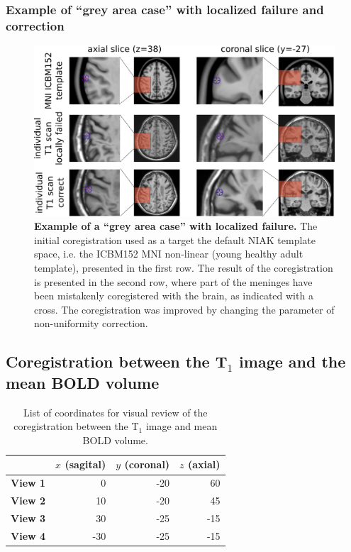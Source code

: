 \documentclass[12pt]{paper}%
\begin{document}
\subsubsection{Example of ``grey area case'' with localized failure and correction}
\begin{figure}[htbp]
\begin{center}
\includegraphics[width=0.7\linewidth]{fig_qc_grey_case}

\end{center}
\caption{
{\bf Example of a ``grey area case'' with localized failure.} {The initial coregistration used as a target the default NIAK template space, i.e. the ICBM152 MNI non-linear (young healthy adult template), presented in the first row. The result of the coregistration is presented in the second row, where part of the meninges have been mistakenly coregistered with the brain, as indicated with a cross. The coregistration was improved by changing the parameter of non-uniformity correction.}
}
\label{fig_qc_grey_case}
\end{figure}

\subsection{Coregistration between the T$_1$ image and the mean BOLD volume}

\begin{table}[htbp]
\centering
\captionsetup{justification=centering,margin=2cm}
\label{tab_coord_bold}
 \begin{tabular}{c|rrr}
  & $x$ (sagital) & $y$ (coronal) & $z$ (axial)\\
  \hline
  \textbf{View 1} & 0 & -20 & 60\\
  \textbf{View 2} & 10 & -20 & 45\\
  \textbf{View 3} & 30 & -25 & -15\\
  \textbf{View 4} & -30 & -25 & -15\\
 \end{tabular} 
 \caption{List of coordinates for visual review of the coregistration between the T$_1$ image and mean BOLD volume.}
\end{table}
\end{document}
